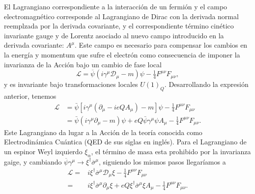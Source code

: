 El Lagrangiano correspondiente a la interacción de un fermión y el
campo electromagnético corresponde al Lagrangiano de Dirac con la
derivada normal reemplzada por la derivada covariante, y el
correspondiente término cinético invariante gauge y de Lorentz
asociado al nuevo campo introducido en la derivada covariante:
$A^\mu$. Este campo es necesario para compensar los cambios en la
energía y momentum que sufre el electrón como consecuencia de imponer
la invarianza de la Acción bajo un cambio de fase local
\begin{equation}
  \label{eq:201qft}
  \mathcal{L}=\overline{\psi}\left(i\gamma^\mu\mathcal{D}_\mu-m\right)\psi -\tfrac{1}{4}F^{\mu\nu}F_{\mu\nu},
\end{equation}
y es invariante bajo transformaciones locales $U(1)_Q$. Desarrollando la expresión anterior, tenemos
\begin{align}
    \mathcal{L}&=\bar{\psi}\left[i\gamma^\mu\left(\partial_\mu-ieQA_\mu\right)-m\right]\psi -\tfrac{1}{4}F^{\mu\nu}F_{\mu\nu}\nonumber\\
    &=\bar{\psi}\left(i\gamma^\mu\partial_\mu-m\right)\psi+eQ\bar{\psi}\gamma^\mu\psi A_\mu -\tfrac{1}{4}F^{\mu\nu}F_{\mu\nu}.
\end{align}
Este Lagrangiano da lugar a la Acción de la teoría conocida como Electrodinámica Cuántica (QED de sus siglas en inglés). Para el Lagrangiano de un espinor Weyl izquierdo $\xi_{\alpha}$, el término de masa esta prohibido por la invarianza gaige, y cambiando $\overline{\psi}\gamma^{\mu}\to \xi^{\dagger}\overline{\sigma}^{\mu}$, siguiendo los mismos pasos  llegaríamos a
\begin{align}
     \mathcal{L}=&i\xi^{\dagger}\overline{\sigma}^\mu\mathcal{D}_\mu\xi -\tfrac{1}{4}F^{\mu\nu}F_{\mu\nu} \nonumber\\
=&i\xi^{\dagger}\overline{\sigma}^\mu\partial_\mu\xi+eQ\xi^{\dagger}\overline{\sigma}^\mu\xi A_\mu -\tfrac{1}{4}F^{\mu\nu}F_{\mu\nu}.
\end{align}


